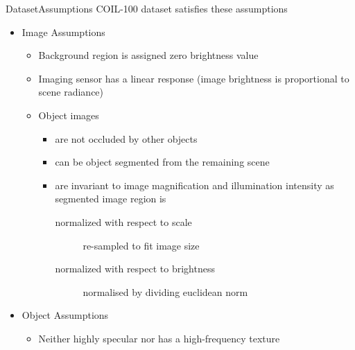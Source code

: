 \documentclass[aspectratio=169, handout, 10pt, hyperref=colorlinks]{beamer}
\begin{document}
\begin{frame}{Dataset}{Assumptions}
    COIL-100 dataset satisfies these assumptions
    \begin{itemize}
        \item Image Assumptions
        \begin{itemize}
            \item Background region is assigned zero brightness value
            \item Imaging sensor has a linear response (image brightness is proportional to scene radiance)
            \item Object images
            \begin{itemize}
            \item are not occluded by other objects
            \item can be object segmented from the remaining scene
            \item are invariant to image magnification and illumination intensity as segmented image region is
            \begin{description}
            \item[normalized with respect to scale] re-sampled to fit image size
            \item[normalized with respect to brightness] normalised by dividing euclidean norm
        \end{description}
        \end{itemize}
        \end{itemize}
        \item Object Assumptions
        \begin{itemize}
            \item Neither highly specular nor has a high-frequency texture
        \end{itemize}
    \end{itemize}
\end{frame}
\end{document}
